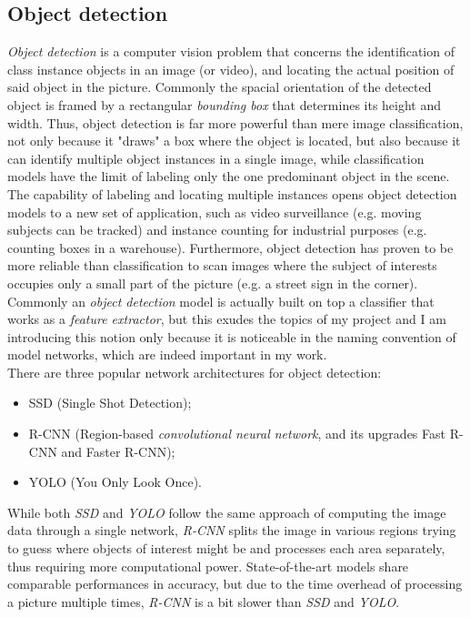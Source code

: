	\subsection{Object detection}
	\emph{Object detection} is a computer vision problem that concerns the identification of class instance objects in an image (or video), and locating the actual position of said object in the picture. Commonly the spacial orientation of the detected object is framed by a rectangular \emph{bounding box} that determines its height and width. Thus, object detection is far more powerful than mere image classification, not only because it "draws" a box where the object is located, but also because it can identify multiple object instances in a single image, while classification models have the limit of labeling only the one predominant object in the scene. The capability of labeling and locating multiple instances opens object detection models to a new set of application, such as video surveillance (e.g. moving subjects can be tracked) and instance counting for industrial purposes (e.g. counting boxes in a warehouse). Furthermore, object detection has proven to be more reliable than classification to scan images where the subject of interests occupies only a small part of the picture (e.g. a street sign in the corner). \\
	Commonly an \emph{object detection} model is actually built on top a classifier that works as a \emph{feature extractor}, but this exudes the topics of my project and I am introducing this notion only because it is noticeable in the naming convention of model networks, which are indeed important in my work. \\
	There are three popular network architectures for object detection:
	\begin{itemize}
		\item SSD (Single Shot Detection);
		\item R-CNN (Region-based \emph{convolutional neural network}, and its upgrades Fast R-CNN and Faster R-CNN);
		\item YOLO (You Only Look Once).
	\end{itemize}
While both \emph{SSD} and \emph{YOLO} follow the same approach of computing the image data through a single network, \emph{R-CNN} splits the image in various regions trying to guess where objects of interest might be and processes each area separately, thus requiring more computational power. State-of-the-art models share comparable performances in accuracy, but due to the time overhead of processing a picture multiple times, \emph{R-CNN} is a bit slower than \emph{SSD} and \emph{YOLO}.

